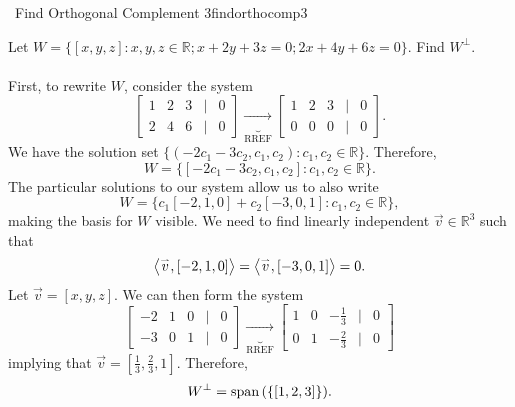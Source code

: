         \begin{example}{\Difficulty\,\Difficulty\,\,Find Orthogonal Complement 3}{findorthocomp3}

            Let \(W=\{[x,y,z]:x,y,z\in\mathbb{R};x+2y+3z=0;2x+4y+6z=0\}\). Find \(W^\perp\).
            \\
            \\
            First, to rewrite \(W\), consider the system
            \begin{equation*}
                \begin{bmatrix}
                    1 & 2 & 3 & | & 0 \\
                    2 & 4 & 6 & | & 0
                \end{bmatrix}\underbrace{\to}_\text{RREF}
                \begin{bmatrix}
                    1 & 2 & 3 & | & 0 \\
                    0 & 0 & 0 & | & 0
                \end{bmatrix}.
            \end{equation*}
            We have the solution set \(\{(-2c_1-3c_2,c_1,c_2):c_1,c_2\in\mathbb{R}\}\). Therefore,
            \begin{equation*}
                W=\{[-2c_1-3c_2,c_1,c_2]:c_1,c_2\in\mathbb{R}\}.
            \end{equation*}
            The particular solutions to our system allow us to also write
            \begin{equation*}
                W=\{c_1[-2,1,0]+c_2[-3,0,1]:c_1,c_2\in\mathbb{R}\},
            \end{equation*}
            making the basis for \(W\) visible. We need to find linearly independent \(\vec{v}\in\mathbb{R}^3\) such that
            \begin{equation*}
                \left\langle \overset{_{\rightharpoonup}}{v},[-2,1,0]\right\rangle=\left\langle \overset{_{\rightharpoonup}}{v},[-3,0,1]\right\rangle=0.
            \end{equation*}
            Let \(\vec{v}=[x,y,z]\). We can then form the system
            \begin{equation*}
                \begin{bmatrix}
                    -2 & 1 & 0 & | & 0 \\
                    -3 & 0 & 1 & | & 0
                \end{bmatrix}\underbrace{\to}_\text{RREF}
                \begin{bmatrix}
                    1 & 0 & -\frac{1}{3} & | & 0 \\
                    0 & 1 & -\frac{2}{3} & | & 0
                \end{bmatrix}
            \end{equation*}
            implying that \(\vec{v}=[\frac{1}{3},\frac{2}{3},1]\). Therefore,
            \begin{equation*}
                W^\perp=\text{span\,}(\{[1,2,3]\}).
            \end{equation*}
        \end{example}
